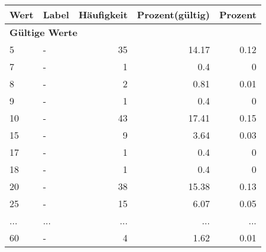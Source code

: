      \begin{longtable}{lXrrr}
     \toprule
     \textbf{Wert} & \textbf{Label} & \textbf{Häufigkeit} & \textbf{Prozent(gültig)} & \textbf{Prozent} \\
     \endhead
     \midrule
     \multicolumn{5}{l}{\textbf{Gültige Werte}}\\
        5 & \multicolumn{1}{X}{-} & %
          \num{35} &
          \num[round-mode=places,round-precision=2]{14,17} &
          \num[round-mode=places,round-precision=2]{0,12} \\
        7 & \multicolumn{1}{X}{-} & %
          \num{1} &
          \num[round-mode=places,round-precision=2]{0,4} &
          \num[round-mode=places,round-precision=2]{0} \\
        8 & \multicolumn{1}{X}{-} & %
          \num{2} &
          \num[round-mode=places,round-precision=2]{0,81} &
          \num[round-mode=places,round-precision=2]{0,01} \\
        9 & \multicolumn{1}{X}{-} & %
          \num{1} &
          \num[round-mode=places,round-precision=2]{0,4} &
          \num[round-mode=places,round-precision=2]{0} \\
        10 & \multicolumn{1}{X}{-} & %
          \num{43} &
          \num[round-mode=places,round-precision=2]{17,41} &
          \num[round-mode=places,round-precision=2]{0,15} \\
        15 & \multicolumn{1}{X}{-} & %
          \num{9} &
          \num[round-mode=places,round-precision=2]{3,64} &
          \num[round-mode=places,round-precision=2]{0,03} \\
        17 & \multicolumn{1}{X}{-} & %
          \num{1} &
          \num[round-mode=places,round-precision=2]{0,4} &
          \num[round-mode=places,round-precision=2]{0} \\
        18 & \multicolumn{1}{X}{-} & %
          \num{1} &
          \num[round-mode=places,round-precision=2]{0,4} &
          \num[round-mode=places,round-precision=2]{0} \\
        20 & \multicolumn{1}{X}{-} & %
          \num{38} &
          \num[round-mode=places,round-precision=2]{15,38} &
          \num[round-mode=places,round-precision=2]{0,13} \\
        25 & \multicolumn{1}{X}{-} & %
          \num{15} &
          \num[round-mode=places,round-precision=2]{6,07} &
          \num[round-mode=places,round-precision=2]{0,05} \\
       ... & ... & ... & ... & ... \\
        60 & \multicolumn{1}{X}{-} & %
          \num{4} &
          \num[round-mode=places,round-precision=2]{1,62} &
          \num[round-mode=places,round-precision=2]{0,01} \\


\end{longtable}
